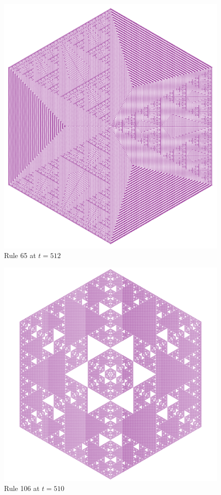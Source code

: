 \documentclass{article}
\begin{document}
\begin{figure}[H]
    \centering
    \includegraphics[width=.58\textwidth]{graphics/behavior/fractals/rule-65-time-512-OneAlive.pdf}
    \caption{Rule 65 at $t=512$}
    \label{fig:rule-65-time-512-OneAlive}
\end{figure}
\begin{figure}[H]
    \centering
    \includegraphics[width=.64\textwidth]{graphics/behavior/fractals/rule-106-time-510-OneAlive.pdf}
    \caption{Rule 106 at $t=510$}
    \label{fig:rule-106-time-510-OneAlive}
\end{figure}

\pagebreak
\ \\
\vspace{5mm}
\end{document}
